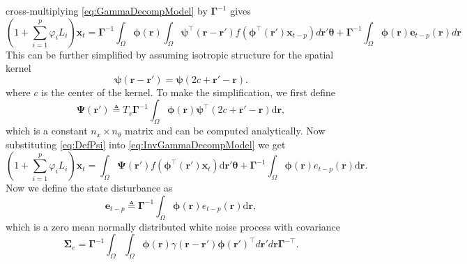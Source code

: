 \documentclass[a4paper,10pt]{article}
\begin{document}
cross-multiplying \eqref{eq:GammaDecompModel} by $\boldsymbol{\Gamma}^{-1}$ gives
\begin{equation}\label{eq:InvGammaDecompModel}
 (1+\sum_{i=1}^{p}\varphi_i L_i) \mathbf{x}_t=\boldsymbol\Gamma^{-1}\int_{\Omega}\boldsymbol \phi(\mathbf r)\int_{\Omega}\boldsymbol{\psi}^\top\left(\mathbf{r}-\mathbf{r}'\right) f(\boldsymbol{\phi}^{\top}\left(\mathbf{r'}\right) \mathbf{x}_{t-p})d\mathbf r'\boldsymbol{\theta}+\boldsymbol\Gamma^{-1}\int_{\Omega}\boldsymbol\phi(\mathbf r)\mathbf e_{t-p}(\mathbf r)d\mathbf r
\end{equation}
This can be further simplified by assuming isotropic structure for the spatial kernel
\begin{equation}
	\boldsymbol{\psi} (\mathbf{r}-\mathbf{r}') = \boldsymbol{\psi} (2c+\mathbf{r}'-\mathbf{r}).
\end{equation}
where $c$ is the center of the kernel. To make the simplification, we first define
\begin{equation}\label{eq:DefPsi}
	\boldsymbol{\Psi}(\mathbf{r}') \triangleq T_s\boldsymbol{\Gamma}^{-1}\int_\Omega {\boldsymbol{\phi}(\mathbf{r})\boldsymbol{\psi}^{\top} (2c+\mathbf{r}'-\mathbf{r})\textrm{d}\mathbf{r}},
\end{equation}
which is a constant $n_x \times n_{\theta}$ matrix and can be computed analytically. Now substituting \eqref{eq:DefPsi} into \eqref{eq:InvGammaDecompModel} we get
\begin{equation}
(1+\sum_{i=1}^{p}\varphi_i L_i) \mathbf{x}_t = \int_\Omega \boldsymbol{\Psi}(\mathbf{r}') f(\boldsymbol{\phi}^{\top}(\mathbf{r}')\mathbf{x}_t) \textrm{d}\mathbf{r}' \boldsymbol{\theta}
+ \boldsymbol{\Gamma}^{-1} \int_\Omega{\boldsymbol{\phi}(\mathbf{r})e_{t-p}(\mathbf{r})\textrm{d}\mathbf{r}}.
\end{equation}
Now we define the state disturbance as
\begin{equation}\label{eq:Wt} 
	\mathbf{e}_{t-p} \triangleq \boldsymbol{\Gamma}^{-1}\int_\Omega {\boldsymbol{\phi} ( \mathbf{r} )e_{t-p}( \mathbf{r} )\textrm{d}\mathbf{r}},
\end{equation}
which is a zero mean normally distributed white noise process with covariance
\begin{equation}
	\boldsymbol\Sigma_e =\mathbf{\Gamma}^{-1}\int_{\Omega}\int_{\Omega}\boldsymbol{\phi}\left(\mathbf r\right) \gamma\left(\mathbf r- \mathbf r' \right)\boldsymbol{\phi}\left(\mathbf r'\right)^{\top}d\mathbf r' d\mathbf r\mathbf{\Gamma}^{- \top}. 
\end{equation}
\end{document}
